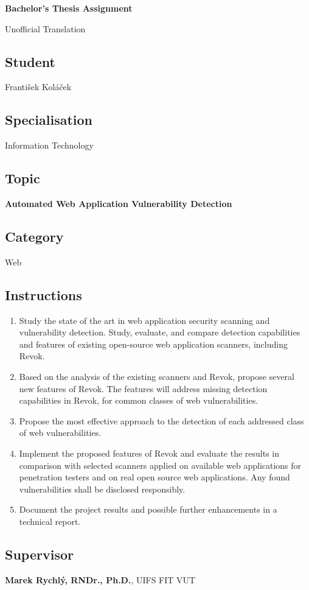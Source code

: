 
\begin{center}
\textbf{\huge Bachelor's Thesis Assignment}

\Large Unofficial Translation
\end{center}


\subsection*{Student}
František Koláček

\subsection*{Specialisation}
Information Technology

\subsection*{Topic}
\textbf{Automated Web Application Vulnerability Detection}

\subsection*{Category}
Web


\subsection*{Instructions}
\begin{enumerate}
	\item Study the state of the art in web application security scanning and vulnerability detection. Study, evaluate, and compare detection capabilities and features of existing open-source web application scanners, including Revok.
	\item Based on the analysis of the existing scanners and Revok, propose several new features of Revok. The features will address missing detection capabilities in Revok, for common classes of web vulnerabilities.
	\item Propose the most effective approach to the detection of each addressed class of web vulnerabilities.
	\item Implement the proposed features of Revok and evaluate the results in comparison with selected scanners applied on available web applications for penetration testers and on real open source web applications. Any found vulnerabilities shall be disclosed responsibly.
	\item Document the project results and possible further enhancements in a technical report.
\end{enumerate}

\subsection*{Supervisor}
\textbf{Marek Rychlý, RNDr., Ph.D.}, UIFS FIT VUT



